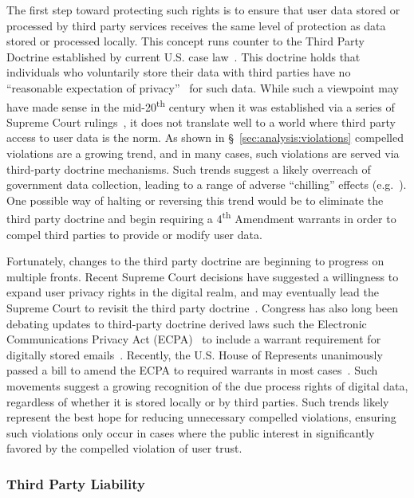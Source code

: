 The first step toward protecting such rights is to ensure that user
data stored or processed by third party services receives the same
level of protection as data stored or processed locally. This concept
runs counter to the Third Party Doctrine established by current
U.S. case law~\cite{thompson-thirdparty}. This doctrine holds that
individuals who voluntarily store their data with third parties have
no ``reasonable expectation of privacy''~\cite{scotus-katzvus} for
such data. While such a viewpoint may have made sense in the
mid-20\textsuperscript{th} century when it was established via a
series of Supreme Court rulings~\cite{scotus-usvmiller-privacy,
  scotus-smithvmaryland}, it does not translate well to a world where
third party access to user data is the norm. As shown in
\S~\ref{sec:analysis:violations} compelled violations are a growing
trend, and in many cases, such violations are served via third-party
doctrine mechanisms. Such trends suggest a likely overreach of
government data collection, leading to a range of adverse ``chilling''
effects (e.g.~\cite{penney2016}). One possible way of halting or
reversing this trend would be to eliminate the third party doctrine
and begin requiring a 4\textsuperscript{th} Amendment warrants in
order to compel third parties to provide or modify user data.

Fortunately, changes to the third party doctrine are beginning to
progress on multiple fronts. Recent Supreme Court decisions have
suggested a willingness to expand user privacy rights in the digital
realm, and may eventually lead the Supreme Court to revisit the third
party doctrine~\cite{scotus-usvjones}.  Congress has also long been
debating updates to third-party doctrine derived laws such the
Electronic Communications Privacy Act (ECPA)~\cite{ecpa} to include a
warrant requirement for digitally stored
emails~\cite{eff-ecpareform}. Recently, the U.S. House of Represents
unanimously passed a bill to amend the ECPA to required warrants in
most cases~\cite{trujillo-ecpa}. Such movements suggest a growing
recognition of the due process rights of digital data, regardless of
whether it is stored locally or by third parties. Such trends likely
represent the best hope for reducing unnecessary compelled violations,
ensuring such violations only occur in cases where the public interest
in significantly favored by the compelled violation of user trust.

\subsubsection{Third Party Liability}

